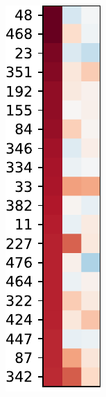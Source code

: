 \begin{figure}[h]
    \centering
    \begin{subfigure}[b]{0.3\textwidth}
        \centering
        \includegraphics[width=\textwidth]{figs/varimax-magnatagatune-0.pdf}

\end{subfigure}
\end{figure}
